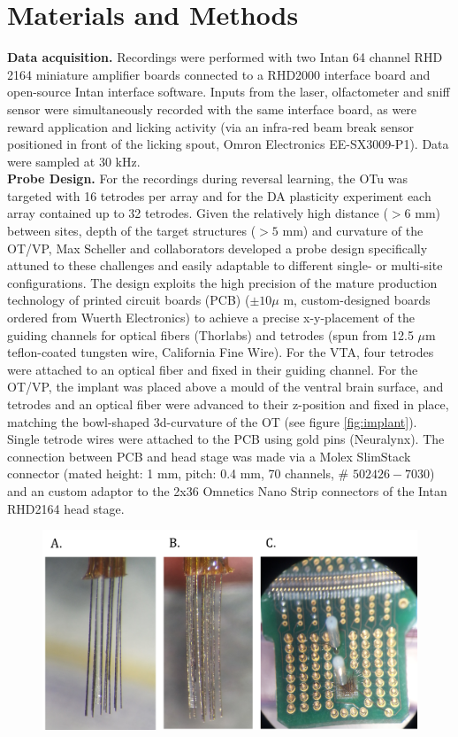 \section{Materials and Methods}
\label{sec:MatAndMet}
\begin{framed}
\textbf{Data acquisition.} Recordings were performed with two Intan 64 channel RHD 2164 miniature amplifier boards connected to a RHD2000 interface board and open-source Intan interface software. Inputs from the laser, olfactometer and sniff sensor were simultaneously recorded with the same interface board, as were reward application and licking activity (via an infra-red beam break sensor positioned in front of the licking spout, Omron Electronics EE-SX3009-P1). Data were sampled at 30 kHz.\\\textbf{Probe Design.} For the recordings during reversal learning, the OTu was targeted with 16 tetrodes per array and for the DA plasticity experiment each array contained up to 32 tetrodes. Given the relatively high distance ($>6$ mm) between sites, depth of the target structures ($>5$ mm) and curvature of the OT/VP, Max Scheller and collaborators developed a probe design specifically attuned to these challenges and easily adaptable to different single- or multi-site configurations.%
The design exploits the high precision of the mature production technology of printed circuit boards (PCB)  ($\pm10\mu$ m, custom-designed boards ordered from Wuerth Electronics) to achieve a precise x-y-placement of the guiding channels for optical fibers (Thorlabs) and tetrodes (spun from 12.5 $\mu$m teflon-coated tungsten wire, California Fine Wire). For the VTA, four tetrodes were attached to an optical fiber and fixed in their guiding channel. For the OT/VP, the implant was placed above a mould of the ventral brain surface, and tetrodes and an optical fiber were advanced to their z-position and fixed in place, matching the bowl-shaped 3d-curvature of the OT (see figure \ref{fig:implant}). Single tetrode wires were attached to the PCB using gold pins (Neuralynx). The connection between PCB and head stage was made via a Molex SlimStack connector (mated height: 1 mm, pitch: 0.4 mm, 70 channels, \# $502426-7030$) and an custom adaptor to the 2x36 Omnetics Nano Strip connectors of the Intan RHD2164 head stage.\\
\begin{figure}[H]
    \centering
    \includegraphics[scale=0.4]{figures/Implant.png}

\end{figure}
\end{framed}

